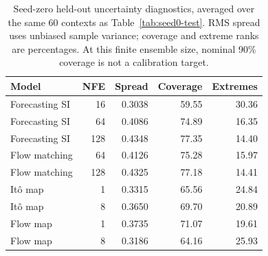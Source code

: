 \begin{table}[t]
\caption{Seed-zero held-out uncertainty diagnostics, averaged over the same 60 contexts as Table~\ref{tab:seed0-test}. RMS spread uses unbiased sample variance; coverage and extreme ranks are percentages. At this finite ensemble size, nominal 90\% coverage is not a calibration target.}
\label{tab:seed0-calibration}
\centering
\setlength{\tabcolsep}{4.5pt}
\begin{tabular}{lrrrr}
\toprule
Model & NFE & Spread & Coverage & Extremes \\
\midrule
Forecasting SI & 16 & 0.3038 & 59.55 & 30.36 \\
Forecasting SI & 64 & 0.4086 & 74.89 & 16.35 \\
Forecasting SI & 128 & 0.4348 & 77.35 & 14.40 \\
Flow matching & 64 & 0.4126 & 75.28 & 15.97 \\
Flow matching & 128 & 0.4325 & 77.18 & 14.41 \\
It\^o map & 1 & 0.3315 & 65.56 & 24.84 \\
It\^o map & 8 & 0.3650 & 69.70 & 20.89 \\
Flow map & 1 & 0.3735 & 71.07 & 19.61 \\
Flow map & 8 & 0.3186 & 64.16 & 25.93 \\
\bottomrule
\end{tabular}
\end{table}
